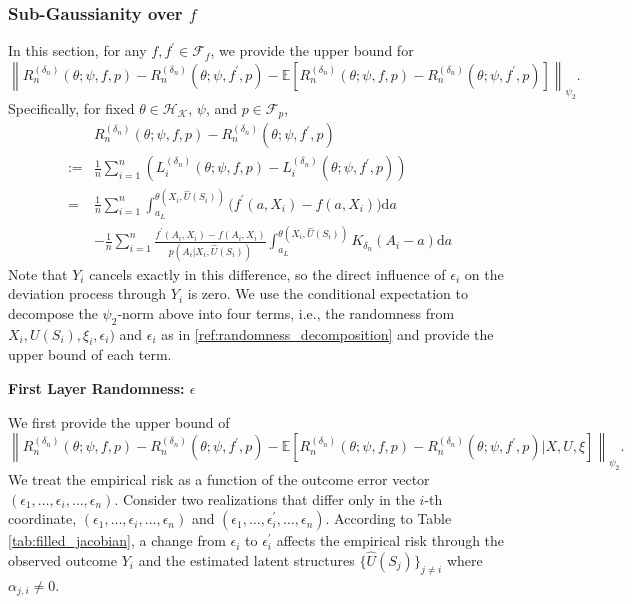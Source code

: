 \documentclass[12pt]{article}
\newcommand{\E}{\mathbb{E}}
\begin{document}
\subsubsection{Sub-Gaussianity over $f$}
In this section, for any $f,f^\prime\in\mathcal{F}_{f}$, we provide the upper bound for
$$\left\|R_n^{(\delta_n)}(\theta;\psi,f,p)-R_n^{({\delta_n})}(\theta;\psi,f^\prime,p)-\E\left[R_n^{(\delta_n)}(\theta;\psi,f,p)-R_n^{({\delta_n})}(\theta;\psi,f^\prime,p)\right]\right\|_{\psi_2}.$$
Specifically, for fixed $\theta\in\mathcal{H}_\mathcal{K}$, $\psi$, and $p\in\mathcal{F}_p$,
\begin{align*}
    &R_n^{(\delta_n)}(\theta;\psi,f,p)-R_n^{({\delta_n})}(\theta;\psi,f^\prime,p)\\
    := & \frac{1}{n}\sum_{i=1}^n \left(L^{(\delta_n)}_i(\theta;\psi,f,p) - L^{(\delta_n)}_i(\theta;\psi,f^\prime,p)\right)
    \\
    = & \frac{1}{n}\sum_{i=1}^n\int_{a_L}^{\theta(X_i,\widehat U(S_i))}\bigl(f^\prime(a,X_i)-f(a,X_i)\bigr)\mathrm{d}a\\
    & - \frac{1}{n}\sum_{i=1}^n\frac{f^\prime(A_i,X_i)-f(A_i,X_i)}{p(A_{i}|X_{i},\widehat U(S_{i}))}  \int_{a_L}^{\theta(X_i,\widehat U(S_i))}K_{\delta_n}(A_i-a)\mathrm{d}a
\end{align*}
Note that $Y_i$ cancels exactly in this difference, so the direct influence of $\epsilon_i$ on the deviation process through $Y_i$ is zero.
We use the conditional expectation to decompose the $\psi_2$-norm above into four terms, i.e., the randomness from $X_i,U(S_i),\xi_i,\epsilon_i)$ and $\epsilon_i$ as in \eqref{ref:randomness_decomposition} and provide the upper bound of each term.

\noindent\textbf{First Layer Randomness: $\epsilon$}

\noindent We first provide the upper bound of
$$\left\|R_n^{(\delta_n)}(\theta;\psi,f,p)-R_n^{({\delta_n})}(\theta;\psi,f^\prime,p)-\E\left[R_n^{(\delta_n)}(\theta;\psi,f,p)-R_n^{({\delta_n})}(\theta;\psi,f^\prime,p)|X,U,\xi\right]\right\|_{\psi_2}.$$
We treat the empirical risk as a function of the outcome error vector $(\epsilon_1, \ldots,\epsilon_i,\ldots, \epsilon_n)$. Consider two realizations that differ only in the $i$-th coordinate, $(\epsilon_1, \ldots,\epsilon_i,\ldots, \epsilon_n)$ and $(\epsilon_1, \ldots,\epsilon_i^\prime,\ldots, \epsilon_n)$. According to Table \ref{tab:filled_jacobian}, a change from $\epsilon_i$ to $\epsilon_i^\prime$ affects the empirical risk through the observed outcome $Y_i$ and the estimated latent structures $\{\widehat U(S_j)\}_{j\neq i}$ where $\alpha_{j,i}\neq 0$.
\end{document}
